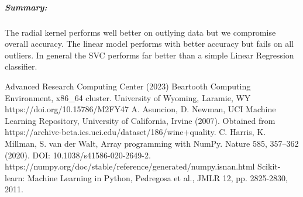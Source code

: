 \documentclass[11pt]{article}
\begin{document}
\hypertarget{summary-2}{%
\subparagraph{Summary:}\label{summary-2}}

The radial kernel performs well better on outlying data but we
compromise overall accuracy. The linear model performs with better
accuracy but fails on all outliers. In general the SVC performs far
better than a simple Linear Regression classifier.    


\begin{thebibliography}{9}
	 Advanced Research Computing Center (2023) Beartooth Computing Environment, x86\_64 cluster. University of Wyoming, Laramie, WY https://doi.org/10.15786/M2FY47
	 A. Asuncion, D. Newman, UCI Machine Learning Repository, University of California, Irvine  (2007).  Obtained from https://archive-beta.ics.uci.edu/dataset/186/wine+quality. 
	 C. Harris, K. Millman, S. van der Walt,  Array programming with NumPy. Nature 585, 357–362 (2020). DOI: 10.1038/s41586-020-2649-2.  https://numpy.org/doc/stable/reference/generated/numpy.isnan.html
	Scikit-learn: Machine Learning in Python, Pedregosa et al., JMLR 12, pp. 2825-2830, 2011. 
\end{thebibliography}
\end{document}
